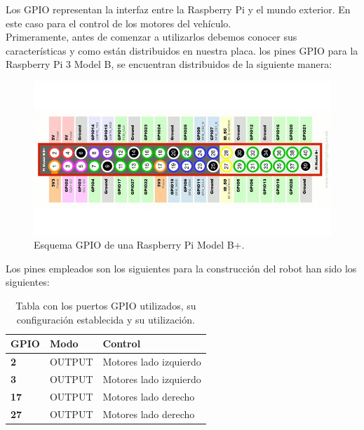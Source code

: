 Los GPIO representan la interfaz entre la Raspberry Pi y el mundo exterior. En este caso para el control de los motores del vehículo.\\

Primeramente, antes de comenzar a utilizarlos debemos conocer sus características y como están distribuidos en nuestra placa. los pines GPIO para la Raspberry Pi 3 Model B, se encuentran distribuidos 
de la siguiente manera:

\begin{figure}[H]
  \begin{center}
    \includegraphics[scale=0.4]{imagenes/robot/gpio-conexiones.jpg}
  \end{center}
  \caption{Esquema GPIO de una Raspberry Pi Model B+.}
  \label{gantt:tareas01}
\end{figure}

Los pines empleados son los siguientes para la construcción del robot han sido los siguientes:\\

\begin{table}[H]
  \begin{center}
    \begin{tabular}{|p{2.5cm}|p{2.5cm}|p{4.5cm}|}
      \hline
      {\textbf{GPIO}} & \textbf{ Modo } & \textbf{ Control }\\
      \hline
      {\textbf{ 2 }} & { OUTPUT } & { Motores lado izquierdo }  \\
     \hline
      {\textbf{ 3 }} & { OUTPUT } & { Motores lado izquierdo } \\
      \hline
      {\textbf{ 17 }} & { OUTPUT } & {  Motores lado derecho } \\
      \hline
      {\textbf{ 27 }} & { OUTPUT } & { Motores lado derecho } \\
     \hline   
    \end{tabular}
  \end{center}
\caption{ Tabla con los puertos GPIO utilizados, su configuración establecida y su utilización. }
\end{table}


